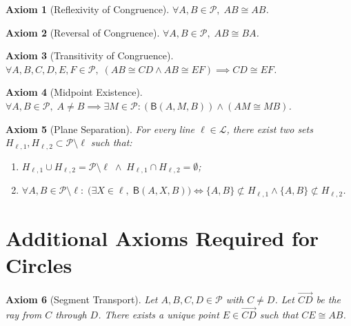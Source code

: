 \documentclass[12pt]{article}
\newtheorem{axiom}{Axiom}[section]
\newcommand{\ray}[1]{\overrightarrow{#1}}
\newcommand{\rel}[1]{\mathsf{B}(#1)}
\newcommand{\congsegment}{\cong}
\begin{document}
\begin{axiom}[Reflexivity of Congruence]
\label{ax:cong-ref}
$\forall A,B\in\mathcal{P},\; AB\congsegment AB$.
\end{axiom}

\begin{axiom}[Reversal of Congruence]
\label{ax:cong-rev}
$\forall A,B\in\mathcal{P},\; AB\congsegment BA$.
\end{axiom}

\begin{axiom}[Transitivity of Congruence]
\label{ax:cong-trans}
$\forall A,B,C,D,E,F\in\mathcal{P},\; (AB\congsegment CD \land AB\congsegment EF) \implies CD\congsegment EF$.
\end{axiom}

\begin{axiom}[Midpoint Existence]
\label{ax:mid-ex}
$\forall A,B\in\mathcal{P},\; A\neq B \implies \exists M\in\mathcal{P}: (\rel{A,M,B}) \land (AM\congsegment MB)$.
\end{axiom}

\begin{axiom}[Plane Separation]
\label{ax:plane-sep}
For every line $\ell\in\mathcal{L}$, there exist two sets $H_{\ell,1}, H_{\ell,2}\subset \mathcal{P}\setminus\ell$ such that:
\begin{enumerate}
\item $H_{\ell,1}\cup H_{\ell,2} = \mathcal{P}\setminus\ell \;\land\; H_{\ell,1}\cap H_{\ell,2} = \emptyset$;
\item $\forall A,B\in\mathcal{P}\setminus\ell:\; \bigl(\exists X\in\ell,\; \rel{A,X,B}\bigr) \iff \{A,B\}\not\subset H_{\ell,1} \land \{A,B\}\not\subset H_{\ell,2}$.
\end{enumerate}
\end{axiom}

\section{Additional Axioms Required for Circles}
\label{sec:new-axioms}

\begin{axiom}[Segment Transport]\label{ax:transport}
Let $A,B,C,D\in\mathcal{P}$ with $C\neq D$. Let $\ray{CD}$ be the ray from $C$ through $D$.
There exists a unique point $E\in\ray{CD}$ such that $CE\congsegment AB$.
\end{axiom}
\end{document}
